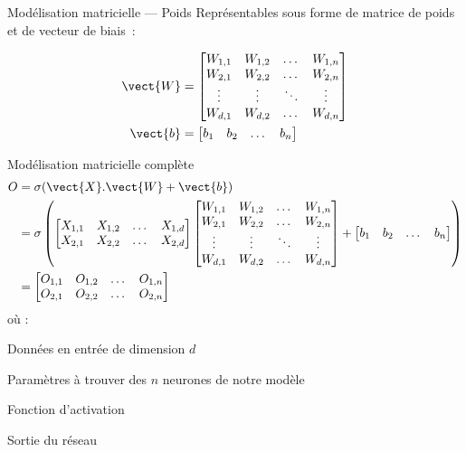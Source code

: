 \begin{frame}{Modélisation matricielle --- Poids}
  Représentables sous forme de matrice de poids et de vecteur de biais~:

  \begin{align*}
    \vect{W} & = \begin{bmatrix}
      W_{1,1} & W_{1,2} & \dots  & W_{1,n} \\
      W_{2,1} & W_{2,2} & \dots  & W_{2,n} \\
      \vdots & \vdots & \ddots & \vdots \\
      W_{d,1} & W_{d,2} & \dots  & W_{d,n}
    \end{bmatrix} \\
    \vect{b} & = \begin{bmatrix}
      b_1 & b_2 & \dots & b_n
    \end{bmatrix}
  \end{align*}
\end{frame}

\begin{frame}{Modélisation matricielle complète}
  \footnotesize
  \begin{align*}
    O & = \sigma (\vect{X}.\vect{W} + \vect{b}) \\
    & = \sigma \left(
    \begin{bmatrix}
      X_{1,1} & X_{1,2} & \dots & X_{1,d} \\
      X_{2,1} & X_{2,2} & \dots & X_{2,d}
    \end{bmatrix}
    \begin{bmatrix}
      W_{1,1} & W_{1,2} & \dots  & W_{1,n} \\
      W_{2,1} & W_{2,2} & \dots  & W_{2,n} \\
      \vdots & \vdots & \ddots & \vdots \\
      W_{d,1} & W_{d,2} & \dots  & W_{d,n}
    \end{bmatrix}
    +
    \begin{bmatrix}
      b_1 & b_2 & \dots & b_n
    \end{bmatrix}
    \right) \\
    & = \begin{bmatrix}
      O_{1,1} & O_{1,2} & \dots & O_{1,n} \\
      O_{2,1} & O_{2,2} & \dots & O_{2,n}
    \end{bmatrix}
  \end{align*}
  où :
  \begin{description}[<+->]
    \item[X] Données en entrée de dimension $d$
    \item[W \& b] Paramètres à trouver des $n$ neurones de notre modèle
    \item[$\bm{\sigma}$] Fonction d'activation
    \item[O] Sortie du réseau
  \end{description}
\end{frame}


